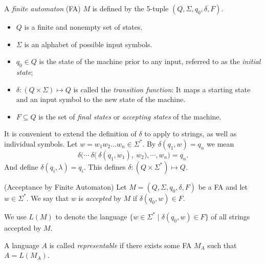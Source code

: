 \documentclass{bcthesis}
\begin{document}
	\begin{definition}
		A \textit{finite automaton} (FA) $M$ is defined by the 5-tuple $(Q, \Sigma, q_0, \delta, F)$.
		\begin{itemize}
			\item [] $Q$ is a finite and nonempty set of states.
			\item [] $\Sigma$ is an alphabet of possible input symbols.
			\item [] $q_0 \in Q$ is the state of the machine prior to any input, referred to as the \textit{initial state};
			\item [] $\delta: (Q \times \Sigma) \mapsto Q$ is called the \textit{transition function}: It maps a starting state and an input symbol to the new state of the machine.
			\item [] $F \subseteq Q$ is the set of \textit{final states} or \textit{accepting states} of the machine.
		\end{itemize}
	\end{definition}

	\begin{remark}
		It is convenient to extend the definition of $\delta$ to apply to strings, as well as individual symbols.
		Let $w = w_1 w_2 \dots w_n \in \Sigma^*$.
		By $\delta(q_1, w) = q_n$ we mean 
		\[
			\delta\bigg( \cdots \ \delta\Big( \ \delta(q_1, w_1), \ w_2 \Big), \cdots, w_n \bigg) = q_n.
		\]
		And define $\delta(q_i, \lambda) = q_i$.
		This defines $\delta: (Q \times \Sigma^*) \mapsto Q$.
	\end{remark}

	\begin{definition}(Acceptance by Finite Automaton)
		Let $M = (Q, \Sigma, q_0, \delta, F)$ be a FA and let $w \in \Sigma^*$.
		We say that $w$ is \textit{accepted} by $M$ if $\delta(q_0, w) \in F$.

		We use $L(M)$ to denote the language $\{ w \in \Sigma^* \mid \delta(q_0, w) \in F \}$ of all strings accepted by $M$.

		A language $A$ is called \textit{representable} if there exists some FA $M_A$ such that $A = L(M_A)$.
	\end{definition}
\end{document}
